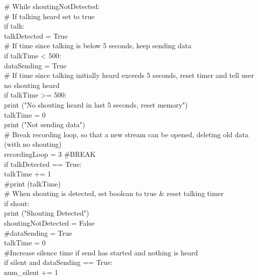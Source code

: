 \documentclass[a4paper,11pt]{report}
\begin{document}
            \# While shoutingNotDetected:\\
            \# If talking heard set to true            \\
            if talk:\\
                talkDetected = True\\

            \# If time since talking is below 5 seconds, keep sending data\\
            if talkTime < 500:\\
                dataSending = True\\

            \# If time since talking initially heard exceeds 5 seconds, reset timer and tell user no shouting heard\\
            if talkTime >= 500:\\
                print ("No shouting heard in last 5 seconds, reset memory")                \\
                talkTime = 0                         \\
                print ("Not sending data")\\
                \# Break recording loop, so that a new stream can be opened, deleting old data (with no shouting)\\
                recordingLoop = 3 \#BREAK\\

            if talkDetected == True:                \\
                talkTime += 1\\
                \#print (talkTime)\\
             
            \# When shouting is detected, set boolean to true \& reset talking timer\\
            if shout:\\
                print ("Shouting Detected")\\
                shoutingNotDetected = False\\
                \#dataSending = True            \\
                talkTime = 0\\

            \#Increase silence time if send has started and nothing is heard\\
            if silent and dataSending == True:\\
                num\_silent += 1\\
\end{document}
